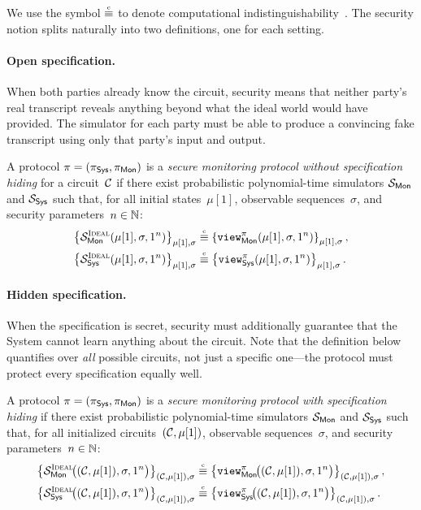 We use the symbol $\indistinguishable$ to denote computational indistinguishability~\cite{BM82}. The security notion splits naturally into two definitions, one for each setting.

\paragraph{Open specification.}
When both parties already know the circuit, security means that neither party's real transcript reveals anything beyond what the ideal world would have provided. The simulator for each party must be able to produce a convincing fake transcript using only that party's input and output.
\begin{definition}\label{def:security-open}
    A protocol $\pi=(\pi_{\textsf{Sys}},\pi_{\textsf{Mon}})$ is a \emph{secure monitoring protocol without specification hiding} for a circuit~$\mathcal{C}$ if there exist probabilistic polynomial-time simulators $\mathcal{S}_{\textsf{Mon}}$ and $\mathcal{S}_{\textsf{Sys}}$ such that, for all initial states~$\mu[1]$, observable sequences~$\sigma$, and security parameters~$n\in\mathbb{N}$:
    \begin{align*}
        \set{\Sc_\Mc^\ideal(\mu[1],\sigma,1^n)}_{\mu[1],\sigma}
            &\indistinguishable
            \set{\view^\pi_\Mc(\mu[1],\sigma,1^n)}_{\mu[1],\sigma}, \\
        \set{\Sc_\Pc^\ideal(\mu[1],\sigma,1^n)}_{\mu[1],\sigma}
            &\indistinguishable
            \set{\view^\pi_\Pc(\mu[1],\sigma,1^n)}_{\mu[1],\sigma}.
    \end{align*}
\end{definition}

\paragraph{Hidden specification.}
When the specification is secret, security must additionally guarantee that the System cannot learn anything about the circuit. Note that the definition below quantifies over \emph{all} possible circuits, not just a specific one---the protocol must protect every specification equally well.
\begin{definition}\label{def:security-hiding}
    A protocol $\pi=(\pi_{\textsf{Sys}},\pi_{\textsf{Mon}})$ is a \emph{secure monitoring protocol with specification hiding} if there exist probabilistic polynomial-time simulators $\mathcal{S}_{\textsf{Mon}}$ and $\mathcal{S}_{\textsf{Sys}}$ such that, for all initialized circuits~$(\mathcal{C},\mu[1])$, observable sequences~$\sigma$, and security parameters~$n\in\mathbb{N}$:
    \begin{align*}
        \set{\Sc_\Mc^\ideal\!\bigl((\Cc,\mu[1]),\sigma,1^n\bigr)}_{(\Cc,\mu[1]),\sigma}
            &\indistinguishable
            \set{\view^\pi_\Mc\!\bigl((\Cc,\mu[1]),\sigma,1^n\bigr)}_{(\Cc,\mu[1]),\sigma}, \\
        \set{\Sc_\Pc^\ideal\!\bigl((\Cc,\mu[1]),\sigma,1^n\bigr)}_{(\Cc,\mu[1]),\sigma}
            &\indistinguishable
            \set{\view^\pi_\Pc\!\bigl((\Cc,\mu[1]),\sigma,1^n\bigr)}_{(\Cc,\mu[1]),\sigma}.
    \end{align*}
\end{definition}
